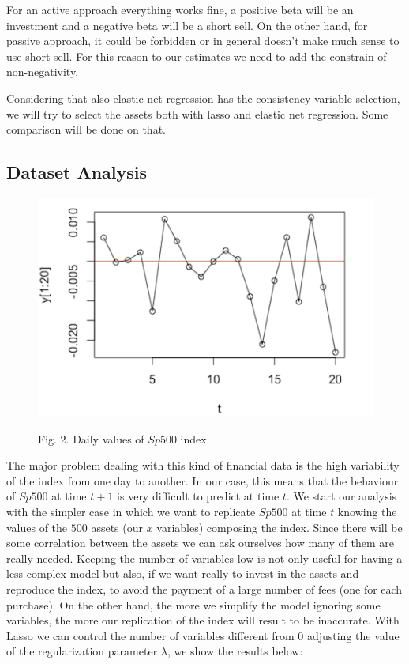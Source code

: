 \documentclass{article}%
\begin{document}
For an active approach everything works fine, a positive beta will be an investment and a negative beta will be a short sell. On the other hand, for passive approach, it could be forbidden or in general doesn't make much sense to use short sell. For this reason to our estimates we need to add the constrain of non-negativity.

Considering that also elastic net regression has the consistency variable selection, we will try to select the assets both with lasso and elastic net regression. Some comparison will be done on that.

\subsection{Dataset Analysis}
\begin{figure}[h!!!]
  \centering
  \includegraphics[scale=0.6]{daily_var.png}
  
\begin{center}
\begin{small}
Fig. 2. Daily values of $Sp500$ index
\end{small}
\end{center}

  \label{daily_var}
\end{figure}

The major problem dealing with this kind of financial data is the high variability of the index from one day to another. In our case, this means that the behaviour of  $Sp500$ at time $t+1$ is very difficult to predict at time $t$.
We start our analysis with the simpler case in which we want to replicate $Sp500$ at time $t$ knowing the values of the $500$ assets (our $x$ variables) composing the index. Since there will be some correlation between the assets we can ask ourselves how many of them are really needed. Keeping the number of variables low is not only useful for having a less complex model but also, if we want really to invest in the assets and reproduce the index, to avoid the payment of a large number of fees (one for each purchase). On the other hand, the more we simplify the model ignoring some variables, the more our replication of the index will result to be inaccurate. With Lasso we can control the number of variables different from $0$ adjusting the value of the regularization parameter $\lambda$, we show the results below: 
\end{document}
